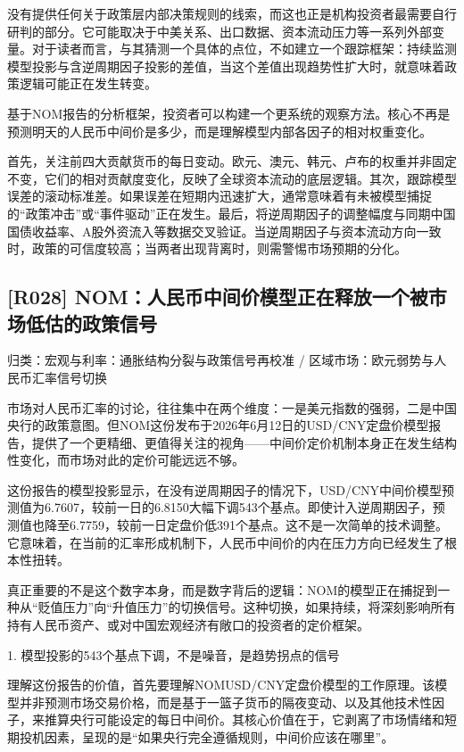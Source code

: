 \documentclass[11pt]{ctexart}
\begin{document}
没有提供任何关于政策层内部决策规则的线索，而这也正是机构投资者最需要自行研判的部分。它可能取决于中美关系、出口数据、资本流动压力等一系列外部变量。对于读者而言，与其猜测一个具体的点位，不如建立一个跟踪框架：持续监测模型投影与含逆周期因子投影的差值，当这个差值出现趋势性扩大时，就意味着政策逻辑可能正在发生转变。

基于NOM报告的分析框架，投资者可以构建一个更系统的观察方法。核心不再是预测明天的人民币中间价是多少，而是理解模型内部各因子的相对权重变化。

首先，关注前四大贡献货币的每日变动。欧元、澳元、韩元、卢布的权重并非固定不变，它们的相对贡献度变化，反映了全球资本流动的底层逻辑。其次，跟踪模型误差的滚动标准差。如果误差在短期内迅速扩大，通常意味着有未被模型捕捉的“政策冲击”或“事件驱动”正在发生。最后，将逆周期因子的调整幅度与同期中国国债收益率、A股外资流入等数据交叉验证。当逆周期因子与资本流动方向一致时，政策的可信度较高；当两者出现背离时，则需警惕市场预期的分化。

\subsection{[R028] NOM：人民币中间价模型正在释放一个被市场低估的政策信号}
{\small\color{refgray}归类：宏观与利率：通胀结构分裂与政策信号再校准 / 区域市场：欧元弱势与人民币汇率信号切换}

市场对人民币汇率的讨论，往往集中在两个维度：一是美元指数的强弱，二是中国央行的政策意图。但NOM这份发布于2026年6月12日的USD/CNY定盘价模型报告，提供了一个更精细、更值得关注的视角——中间价定价机制本身正在发生结构性变化，而市场对此的定价可能远远不够。

这份报告的模型投影显示，在没有逆周期因子的情况下，USD/CNY中间价模型预测值为6.7607，较前一日的6.8150大幅下调543个基点。即使计入逆周期因子，预测值也降至6.7759，较前一日定盘价低391个基点。这不是一次简单的技术调整。它意味着，在当前的汇率形成机制下，人民币中间价的内在压力方向已经发生了根本性扭转。

真正重要的不是这个数字本身，而是数字背后的逻辑：NOM的模型正在捕捉到一种从“贬值压力”向“升值压力”的切换信号。这种切换，如果持续，将深刻影响所有持有人民币资产、或对中国宏观经济有敞口的投资者的定价框架。

1. 模型投影的543个基点下调，不是噪音，是趋势拐点的信号

理解这份报告的价值，首先要理解NOMUSD/CNY定盘价模型的工作原理。该模型并非预测市场交易价格，而是基于一篮子货币的隔夜变动、以及其他技术性因子，来推算央行可能设定的每日中间价。其核心价值在于，它剥离了市场情绪和短期投机因素，呈现的是“如果央行完全遵循规则，中间价应该在哪里”。
\end{document}
